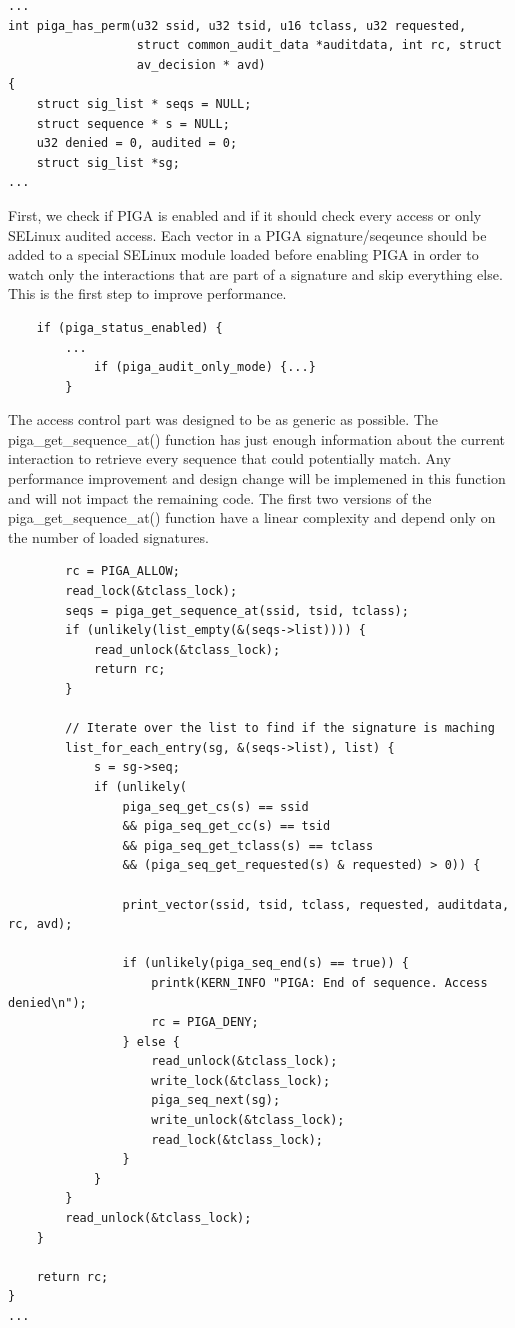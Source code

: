 \documentclass[pdftex,a4paper,titlepage,11pt]{article}
\begin{document}
\begin{lstlisting}
...
int piga_has_perm(u32 ssid, u32 tsid, u16 tclass, u32 requested,
				  struct common_audit_data *auditdata, int rc, struct
				  av_decision * avd)
{
	struct sig_list * seqs = NULL;
	struct sequence * s = NULL;
	u32 denied = 0, audited = 0;
	struct sig_list *sg;
...
\end{lstlisting}

\medskip

First, we check if PIGA is enabled and if it should check every access or
only SELinux audited access. Each vector in a PIGA signature/seqeunce should be
added to a special SELinux module loaded before enabling PIGA in order to watch
only the interactions that are part of a signature and skip everything else.
This is the first step to improve performance.

\begin{lstlisting}
	if (piga_status_enabled) {
		...
			if (piga_audit_only_mode) {...}
		}
\end{lstlisting}

\medskip

The access control part was designed to be as generic as possible. The
piga\_get\_sequence\_at() function has just enough information about the current
interaction to retrieve every sequence that could potentially match. Any
performance improvement and design change will be implemened in this function
and will not impact the remaining code. The first two versions of the
piga\_get\_sequence\_at() function have a linear complexity and depend only on
the number of loaded signatures.

\begin{lstlisting}
		rc = PIGA_ALLOW;
		read_lock(&tclass_lock);
		seqs = piga_get_sequence_at(ssid, tsid, tclass);
		if (unlikely(list_empty(&(seqs->list)))) {
			read_unlock(&tclass_lock);
			return rc;
		}

		// Iterate over the list to find if the signature is maching
		list_for_each_entry(sg, &(seqs->list), list) {
			s = sg->seq;
			if (unlikely(
				piga_seq_get_cs(s) == ssid
				&& piga_seq_get_cc(s) == tsid
				&& piga_seq_get_tclass(s) == tclass
				&& (piga_seq_get_requested(s) & requested) > 0)) {

				print_vector(ssid, tsid, tclass, requested, auditdata, rc, avd);

				if (unlikely(piga_seq_end(s) == true)) {
					printk(KERN_INFO "PIGA: End of sequence. Access denied\n");
					rc = PIGA_DENY;
				} else {
					read_unlock(&tclass_lock);
					write_lock(&tclass_lock);
					piga_seq_next(sg);
					write_unlock(&tclass_lock);
					read_lock(&tclass_lock);
				}
			}
		}
		read_unlock(&tclass_lock);
	}

	return rc;
}
...
\end{lstlisting}
\end{document}
